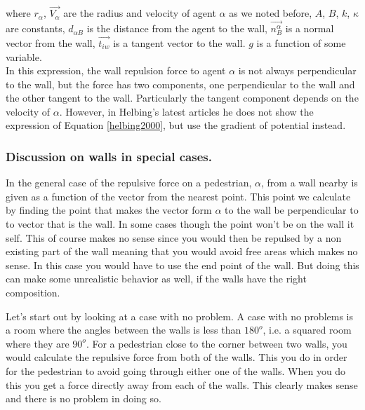 \begin{itemize}
where $ r_{\alpha} $,  $ \vec{V_{\alpha}} $ are the radius and velocity of agent $ \alpha $ as we noted before, $ A $, $ B $, $ k $, $ \kappa $ are constants, $ d_{\alpha B} $ is the distance from the agent to the wall, $ \vec{n_{B}^{\alpha}} $ is a normal vector from the wall, $ \vec{t_{iw}} $ is a tangent vector to the wall. $ g $ is a function of some variable.\\
In this expression, the wall repulsion force to agent $ \alpha $ is not always perpendicular to the wall, but the force has two components, one perpendicular to the wall and the other tangent to the wall. Particularly the tangent component depends on the velocity of $ \alpha $. However, in Helbing's latest articles he does not show the expression of Equation \ref{helbing2000}, but use the gradient of potential instead. 
\end{itemize}

\subsubsection{Discussion on walls in special cases.}
In the general case of the repulsive force on a pedestrian, $\alpha$, from a wall nearby is given as a function of the vector from the nearest point. This point we calculate by finding the point that makes the vector form $\alpha$ to the wall be perpendicular to to vector that is the wall. In some cases though the point won't be on the wall it self. This of course makes no sense since you would then be repulsed by a non existing part of the wall meaning that you would avoid free areas which makes no sense. In this case you would have to use the end point of the wall. But doing this can make some unrealistic behavior as well, if the walls have the right composition. 

Let's start out by looking at a case with no problem. A case with no problems is a room where the angles between the walls is less than $180^o$, i.e. a squared room where they are $90^o$. For a pedestrian close to the corner between two walls, you would calculate the repulsive force from both of the walls. This you do in order for the pedestrian to avoid going through either one of the walls. When you do this you get a force directly away from each of the walls. This clearly makes sense and there is no problem in doing so.

